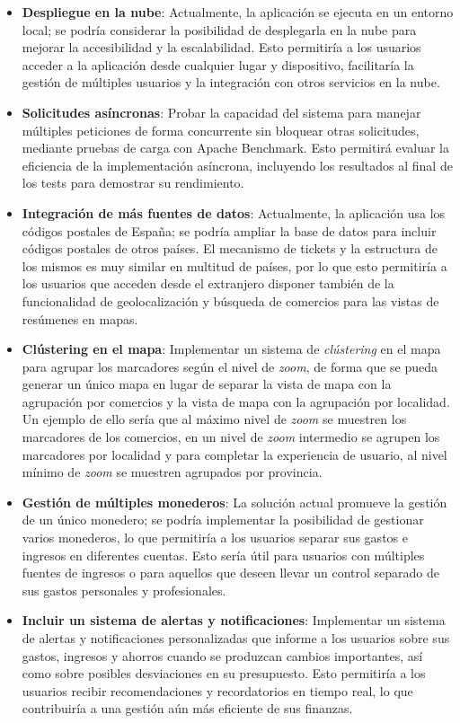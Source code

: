 \begin{itemize}
    \item \textbf{Despliegue en la nube}: Actualmente, la aplicación se ejecuta en un entorno local; se podría considerar la posibilidad de desplegarla en la nube para mejorar la accesibilidad y la escalabilidad. Esto permitiría a los usuarios acceder a la aplicación desde cualquier lugar y dispositivo, facilitaría la gestión de múltiples usuarios y la integración con otros servicios en la nube.
    \item \textbf{Solicitudes asíncronas}: Probar la capacidad del sistema para manejar múltiples peticiones de forma concurrente sin bloquear otras solicitudes, mediante pruebas de carga con Apache Benchmark. Esto permitirá evaluar la eficiencia de la implementación asíncrona, incluyendo los resultados al final de los tests para demostrar su rendimiento.
    \item \textbf{Integración de más fuentes de datos}: Actualmente, la aplicación usa los códigos postales de España; se podría ampliar la base de datos para incluir códigos postales de otros países. El mecanismo de tickets y la estructura de los mismos es muy similar en multitud de países, por lo que esto permitiría a los usuarios que acceden desde el extranjero disponer también de la funcionalidad de geolocalización y búsqueda de comercios para las vistas de resúmenes en mapas.
    \item \textbf{Clústering en el mapa}: Implementar un sistema de \textit{clústering} en el mapa para agrupar los marcadores según el nivel de \textit{zoom}, de forma que se pueda generar un único mapa en lugar de separar la vista de mapa con la agrupación por comercios y la vista de mapa con la agrupación por localidad. Un ejemplo de ello sería que al máximo nivel de \textit{zoom} se muestren los marcadores de los comercios, en un nivel de \textit{zoom} intermedio se agrupen los marcadores por localidad y para completar la experiencia de usuario, al nivel mínimo de \textit{zoom} se muestren agrupados por provincia.
    \item \textbf{Gestión de múltiples monederos}: La solución actual promueve la gestión de un único monedero; se podría implementar la posibilidad de gestionar varios monederos, lo que permitiría a los usuarios separar sus gastos e ingresos en diferentes cuentas. Esto sería útil para usuarios con múltiples fuentes de ingresos o para aquellos que deseen llevar un control separado de sus gastos personales y profesionales.
    \item \textbf{Incluir un sistema de alertas y notificaciones}: Implementar un sistema de alertas y notificaciones personalizadas que informe a los usuarios sobre sus gastos, ingresos y ahorros cuando se produzcan cambios importantes, así como sobre posibles desviaciones en su presupuesto. Esto permitiría a los usuarios recibir recomendaciones y recordatorios en tiempo real, lo que contribuiría a una gestión aún más eficiente de sus finanzas.

\end{itemize}
